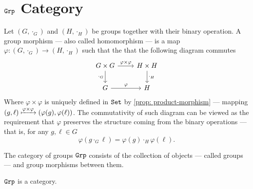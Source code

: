 \section{\texorpdfstring{\({\texttt{Grp}}\)}{Grp} Category}

\begin{definition}\label{def: grp-morphism}
    Let \((G, \cdot_G)\) and \((H, \cdot_H)\) be groups together with their binary
    operation. A group morphism --- also called homomorphism --- is a map \(\varphi:
    (G, \cdot_G) \to (H, \cdot_H)\) such that the that the following diagram
    commutes
    \[
        \begin{tikzcd}
            G \times G \ar[d, swap, "\cdot_G"] \ar[r, "\varphi \times \varphi"]
            &H \times H \ar[d, "\cdot_H"] \\
            G \ar[r, "\varphi"] &H
        \end{tikzcd}
    \]
    Where \(\varphi \times \varphi\) is uniquely defined in \({\texttt{Set}}\) by
    \cref{prop: product-morphism} --- mapping \((g, \ell) \xmapsto{\varphi \times
        \varphi} (\varphi(g), \varphi(\ell))\). The commutativity of such diagram can
    be viewed as the requirement that \(\varphi\) preserves the structure coming
    from the binary operations --- that is, for any \(g, \ell \in G\)
    \[
        \varphi(g \cdot_G \ell) = \varphi(g) \cdot_H \varphi(\ell).
    \]
\end{definition}

\begin{definition}\label{def: grp}
    The category of groups \({\texttt{Grp}}\) consists of the collection of objects ---
    called groups --- and group morphisms between them.
\end{definition}

\begin{proposition}
    \({\texttt{Grp}}\) is a category.
\end{proposition}

